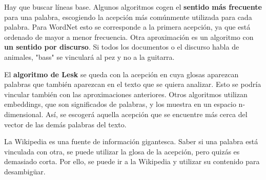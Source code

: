 Hay que buscar líneas base. Algunos algoritmos cogen el \textbf{sentido más frecuente} para una palabra, escogiendo la acepción más comúnmente utilizada para cada palabra. Para WordNet esto se corresponde a la primera acepción, ya que está ordenado de mayor a menor frecuencia. Otra aproximación es un algoritmo con \textbf{un sentido por discurso}. Si todos los documentos o el discurso habla de animales, "bass" se vinculará al pez y no a la guitarra.

El \textbf{algoritmo de Lesk} se queda con la acepción en cuya glosas aparezcan palabras que también aparezcan en el texto que se quiera analizar. Esto se podría vincular también con las aproximaciones anteriores. Otros algoritmos utilizan embeddings, que son significados de palabras, y los muestra en un espacio n-dimensional. Así, se escogerá aquella acepción que se encuentre más cerca del vector de las demás palabras del texto. 

La Wikipedia es una fuente de información gigantesca. Saber si una palabra está vinculada con otra, se puede utilizar la glosa de la acepción, pero quizás es demasiado corta. Por ello, se puede ir a la Wikipedia y utilizar su contenido para desambigüar. 